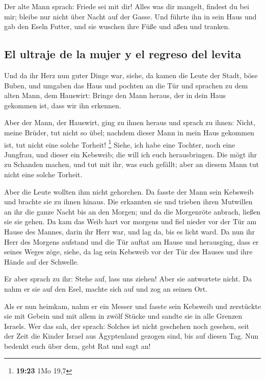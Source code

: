  Der alte Mann sprach: Friede sei mit dir! Alles was dir
mangelt, findest du bei mir; bleibe nur nicht über Nacht auf der Gasse.
 Und führte ihn in sein Haus und gab den Eseln Futter,
und sie wuschen ihre Füße und aßen und tranken.

\hypertarget{el-ultraje-de-la-mujer-y-el-regreso-del-levita}{%
\subsection{El ultraje de la mujer y el regreso del
levita}\label{el-ultraje-de-la-mujer-y-el-regreso-del-levita}}

 Und da ihr Herz nun guter Dinge war, siehe, da kamen die
Leute der Stadt, böse Buben, und umgaben das Haus und pochten an die Tür
und sprachen zu dem alten Mann, dem Hauswirt: Bringe den Mann heraus,
der in dein Haus gekommen ist, dass wir ihn erkennen.

 Aber der Mann, der Hauswirt, ging zu ihnen heraus und
sprach zu ihnen: Nicht, meine Brüder, tut nicht so übel; nachdem dieser
Mann in mein Haus gekommen ist, tut nicht eine solche Torheit!
\footnote{\textbf{19:23} 1Mo 19,7}  Siehe, ich habe eine
Tochter, noch eine Jungfrau, und dieser ein Kebsweib; die will ich euch
herausbringen. Die mögt ihr zu Schanden machen, und tut mit ihr, was
euch gefällt; aber an diesem Mann tut nicht eine solche Torheit.

 Aber die Leute wollten ihm nicht gehorchen. Da fasste
der Mann sein Kebsweib und brachte sie zu ihnen hinaus. Die erkannten
sie und trieben ihren Mutwillen an ihr die ganze Nacht bis an den
Morgen; und da die Morgenröte anbrach, ließen sie sie gehen.
 Da kam das Weib hart vor morgens und fiel nieder vor der
Tür am Hause des Mannes, darin ihr Herr war, und lag da, bis es licht
ward.  Da nun ihr Herr des Morgens aufstand und die Tür
auftat am Hause und herausging, dass er seines Weges zöge, siehe, da lag
sein Kebsweib vor der Tür des Hauses und ihre Hände auf der Schwelle.

 Er aber sprach zu ihr: Stehe auf, lass uns ziehen! Aber
sie antwortete nicht. Da nahm er sie auf den Esel, machte sich auf und
zog an seinen Ort.

 Als er nun heimkam, nahm er ein Messer und fasste sein
Kebsweib und zerstückte sie mit Gebein und mit allem in zwölf Stücke und
sandte sie in alle Grenzen Israels.  Wer das sah, der
sprach: Solches ist nicht geschehen noch gesehen, seit der Zeit die
Kinder Israel aus Ägyptenland gezogen sind, bis auf diesen Tag. Nun
bedenkt euch über dem, gebt Rat und sagt an!

